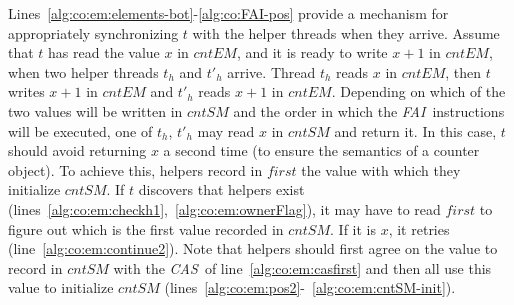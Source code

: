 \documentclass[a4paper,11pt,twoside,openany]{book}
\newcommand{\CAS}{\mbox{\textit{CAS}}}
\newcommand{\FAI}{\mbox{\textit{FAI}}}
\begin{document}
Lines~\ref{alg:co:em:elements-bot}-\ref{alg:co:FAI-pos} provide a mechanism for appropriately
synchronizing $t$ with the helper threads when they arrive. Assume that $t$ has read the
value $x$ in $\mathit{cntEM}$, and it is ready to write $x+1$ in $\mathit{cntEM}$,
when two helper threads $t_h$ and $t'_h$ arrive.
Thread $t_h$ reads $x$ in $\mathit{cntEM}$, then $t$ writes $x+1$ 
in $\mathit{cntEM}$ and $t'_h$ reads  $x+1$ in $\mathit{cntEM}$.
Depending on which of the two values will be written in $\mathit{cntSM}$
and the order in which the \FAI\ instructions will be executed, 
one of $t_h$, $t'_h$ may read $x$ in $\mathit{cntSM}$ and return it.
% 
In this case, $t$ should avoid returning $x$ a second time (to ensure the semantics of
a counter object). To achieve this, helpers record in $\mathit{first}$ the value with
which they initialize $\mathit{cntSM}$. 
% 
If $t$ discovers that helpers exist (lines~\ref{alg:co:em:checkh1},~\ref{alg:co:em:ownerFlag}), 
it may have to read $\mathit{first}$ to figure out which is the first value recorded
in $\mathit{cntSM}$. If it is $x$, it  retries
(line~\ref{alg:co:em:continue2}). Note that helpers should first agree on the value 
to record in $\mathit{cntSM}$ with the \CAS\ of line~\ref{alg:co:em:casfirst} and then all 
use this value to initialize $\mathit{cntSM}$ (lines~\ref{alg:co:em:pos2}-~\ref{alg:co:em:cntSM-init}).
\end{document}
